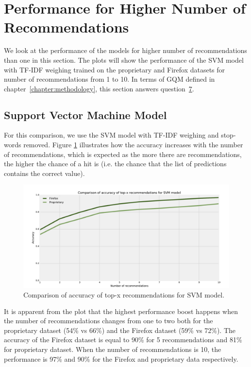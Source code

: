 \section{Performance for Higher Number of Recommendations}
\label{section:compare-number-of-recommendations}

We look at the performance of the models for higher number of recommendations than one in this section. The plots will show the performance of the SVM model with TF-IDF weighing trained on the proprietary and Firefox datasets for number of recommendations from 1 to 10. In terms of GQM defined in chapter~\ref{chapter:methodology}, this section answers question~\hyperlink{question:7}{7}.

\subsection{Support Vector Machine Model}

For this comparison, we use the SVM model with TF-IDF weighing and stop-words removed. Figure \ref{fig:results.topx.svm_accuracy} illustrates how the accuracy increases with the number of recommendations, which is expected as the more there are recommendations, the higher the chance of a hit is (i.e. the chance that the list of predictions contains the correct value).

\begin{figure}[htbp]
    \centering
        \includegraphics[width=\textwidth]{./images/top_x_comparison/svm_accuracy.pdf}
    \caption{Comparison of accuracy of top-x recommendations for SVM model.}
    \label{fig:results.topx.svm_accuracy}
\end{figure}

It is apparent from the plot that the highest performance boost happens when the number of recommendations changes from one to two both for the proprietary dataset (54\% vs 66\%) and the Firefox dataset (59\% vs 72\%). The accuracy of the Firefox dataset is equal to 90\% for 5 recommendations and 81\% for proprietary dataset. When the number of recommendations is 10, the performance is 97\% and 90\% for the Firefox and proprietary data respectively.

